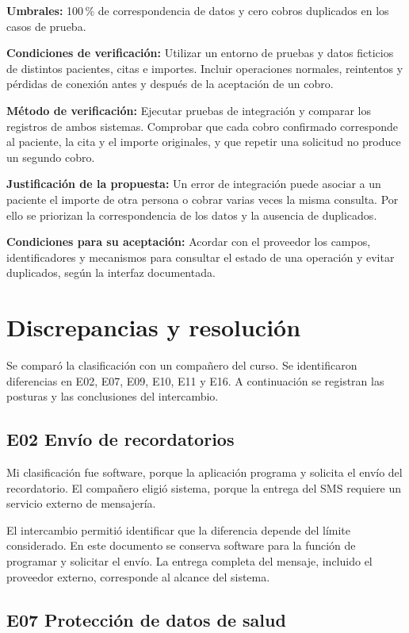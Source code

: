 \documentclass[11pt,a4paper]{article}
\begin{document}
\textbf{Umbrales:}
100\,\% de correspondencia de datos y
cero cobros duplicados en los casos de prueba.

\textbf{Condiciones de verificación:}
Utilizar un entorno de pruebas y datos ficticios
de distintos pacientes, citas e importes.
Incluir operaciones normales, reintentos y
pérdidas de conexión antes y después de
la aceptación de un cobro.

\textbf{Método de verificación:}
Ejecutar pruebas de integración y comparar
los registros de ambos sistemas. Comprobar
que cada cobro confirmado corresponde al
paciente, la cita y el importe originales,
y que repetir una solicitud no produce
un segundo cobro.

\textbf{Justificación de la propuesta:}
Un error de integración puede asociar
a un paciente el importe de otra persona
o cobrar varias veces la misma consulta.
Por ello se priorizan la correspondencia
de los datos y la ausencia de duplicados.

\textbf{Condiciones para su aceptación:}
Acordar con el proveedor los campos,
identificadores y mecanismos para consultar
el estado de una operación y evitar duplicados,
según la interfaz documentada.

\section{Discrepancias y resolución}

Se comparó la clasificación con un compañero
del curso. Se identificaron
diferencias en E02, E07, E09, E10, E11 y E16.
A continuación se registran las posturas y
las conclusiones del intercambio.

\subsection{E02 Envío de recordatorios}

Mi clasificación fue software, porque la
aplicación programa y solicita el envío
del recordatorio. El compañero eligió sistema,
porque la entrega del SMS requiere un
servicio externo de mensajería.

El intercambio permitió identificar que la
diferencia depende del límite considerado.
En este documento se conserva software
para la función de programar y solicitar
el envío. La entrega completa del mensaje,
incluido el proveedor externo, corresponde
al alcance del sistema.

\subsection{E07 Protección de datos de salud}
\end{document}
